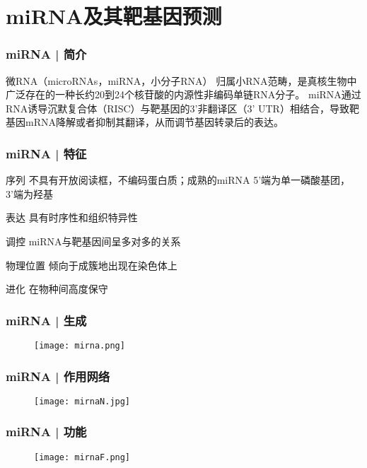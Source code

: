 \section{miRNA及其靶基因预测}

\begin{frame}
  \frametitle{miRNA | 简介}
  \begin{block}{微RNA（microRNAs，miRNA，小分子RNA）}
    归属小RNA范畴，是真核生物中广泛存在的一种长约20到24个核苷酸的内源性非编码单链RNA分子。
    miRNA通过RNA诱导沉默复合体（RISC）与靶基因的3'非翻译区（3' UTR）相结合，导致靶基因mRNA降解或者抑制其翻译，从而调节基因转录后的表达。
  \end{block}
\end{frame}

\begin{frame}
  \frametitle{miRNA | 特征}
  \begin{block}{序列}
    不具有开放阅读框，不编码蛋白质；成熟的miRNA 5'端为单一磷酸基团，3'端为羟基
  \end{block}
  \pause
  \begin{block}{表达}
    具有时序性和组织特异性
  \end{block}
  \pause
  \begin{block}{调控}
    miRNA与靶基因间呈多对多的关系
  \end{block}
  \pause
  \begin{block}{物理位置}
    倾向于成簇地出现在染色体上
  \end{block}
  \pause
  \begin{block}{进化}
    在物种间高度保守
  \end{block}
\end{frame}

\begin{frame}
  \frametitle{miRNA | 生成}
  \begin{figure}
    \centering
    \texttt{[image: mirna.png]}
  \end{figure}
\end{frame}

\begin{frame}
  \frametitle{miRNA | 作用网络}
  \begin{figure}
    \centering
    \texttt{[image: mirnaN.jpg]}
  \end{figure}
\end{frame}

\begin{frame}
  \frametitle{miRNA | 功能}
  \begin{figure}
    \centering
    \texttt{[image: mirnaF.png]}
  \end{figure}
\end{frame}

